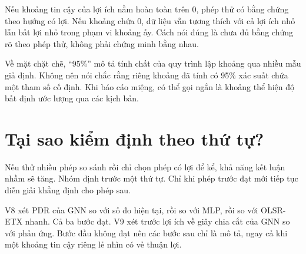 Nếu khoảng tin cậy của lợi ích nằm hoàn toàn trên 0, phép thử có bằng chứng theo hướng có lợi. Nếu khoảng chứa 0, dữ liệu vẫn tương thích với cả lợi ích nhỏ lẫn bất lợi nhỏ trong phạm vi khoảng ấy. Cách nói đúng là chưa đủ bằng chứng rõ theo phép thử, không phải chứng minh bằng nhau.

Về mặt chặt chẽ, ``95\%'' mô tả tính chất của quy trình lập khoảng qua nhiều mẫu giả định. Không nên nói chắc rằng riêng khoảng đã tính có 95\% xác suất chứa một tham số cố định. Khi báo cáo miệng, có thể gọi ngắn là khoảng thể hiện độ bất định ước lượng qua các kịch bản.

\section{Tại sao kiểm định theo thứ tự?}
Nếu thử nhiều phép so sánh rồi chỉ chọn phép có lợi để kể, khả năng kết luận nhầm sẽ tăng. Nhóm định trước một thứ tự. Chỉ khi phép trước đạt mới tiếp tục diễn giải khẳng định cho phép sau.

V8 xét PDR của GNN so với số đo hiện tại, rồi so với MLP, rồi so với OLSR-ETX nhanh. Cả ba bước đạt. V9 xét trước lợi ích về giây chia cắt của GNN so với phản ứng. Bước đầu không đạt nên các bước sau chỉ là mô tả, ngay cả khi một khoảng tin cậy riêng lẻ nhìn có vẻ thuận lợi.


